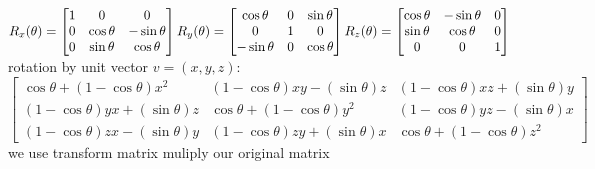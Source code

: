 $R_x(\theta) = \begin{bmatrix}
1 & 0 & 0 \\
      0 & \cos \theta & - \sin \theta \\
      0 & \sin \theta  &  \cos \theta \\
      \end{bmatrix} \\
      R_y(\theta) = \begin{bmatrix}
      \cos \theta & 0 & \sin \theta \\
          0 & 1 & 0 \\
          - \sin \theta & 0 & \cos \theta \\
          \end{bmatrix} \\
          R_z(\theta) = \begin{bmatrix}
          \cos \theta & - \sin \theta & 0 \\
              \sin \theta & \cos \theta & 0\\
              0 & 0 & 1\\
              \end{bmatrix}$\\
              rotation by unit vector ${v} = (x,y,z)$:\\
              $\begin{bmatrix}
              \cos \theta + (1 - \cos \theta) x^2
              & (1 - \cos \theta) x y - (\sin \theta) z 
              & (1 - \cos \theta) x z + (\sin \theta) y  
              \\
                  (1 - \cos \theta) y x + (\sin \theta) z 
                  & \cos \theta + (1 - \cos \theta) y^2
                  & (1 - \cos \theta) y z - (\sin \theta) x
                  \\
                      (1 - \cos \theta) z x - (\sin \theta) y
                      & (1 - \cos \theta) z y + (\sin \theta) x
                      & \cos \theta + (1 - \cos \theta) z^2 
                      \end{bmatrix}$ 
                      we use transform matrix muliply our original matrix\\

